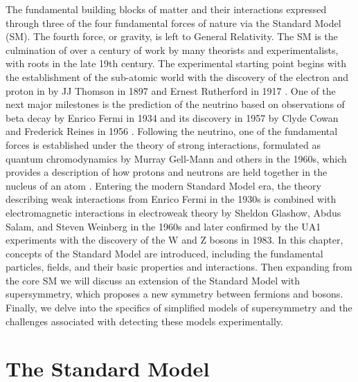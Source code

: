 The fundamental building blocks of matter and their interactions expressed through three of the four fundamental forces of nature via the Standard Model (SM). The fourth force, or gravity, is left to General Relativity. The SM  is the culmination of over a century of work by many theorists and experimentalists, with roots in the late 19th century. The experimental starting point begins with the establishment of the sub-atomic world with the discovery of the electron and proton in by JJ Thomson in 1897 \cite{Thomson:1897cm} and Ernest Rutherford in 1917 \cite{Rutherford:1911zz}. One of the next major milestones is the prediction of the neutrino based on observations of beta decay by Enrico Fermi in 1934 \cite{Fermi:1934hr} and its discovery in 1957 by Clyde Cowan and Frederick Reines in 1956 \cite{Reines:1956rs}.  Following the neutrino, one of the fundamental forces is established under the theory of strong interactions, formulated as quantum chromodynamics by Murray Gell-Mann and others in the 1960s, which provides a description of how protons and neutrons are held together in the nucleus of an atom \cite{GellMann:1964nj}. Entering the modern Standard Model era, the theory describing weak interactions from Enrico Fermi in the 1930s is combined with electromagnetic interactions in electroweak theory by Sheldon Glashow, Abdus Salam, and Steven Weinberg in the 1960s \cite{GLASHOW1961579}\cite{Salam:1968rm}\cite{Weinberg:1967tq} and later confirmed by the UA1 experiments with the discovery of the W and Z bosons in 1983\cite{arnison1983experimental}\cite{glashow1984future}.
In this chapter, concepts of the Standard Model are introduced, including the fundamental particles, fields, and their basic properties and interactions. Then expanding from the core SM we will discuss an extension of the Standard Model with supersymmetry, which proposes a new symmetry between fermions and bosons. Finally, we delve into the specifics of simplified models of supersymmetry and the challenges associated with detecting these models experimentally.



\section{The Standard Model}


